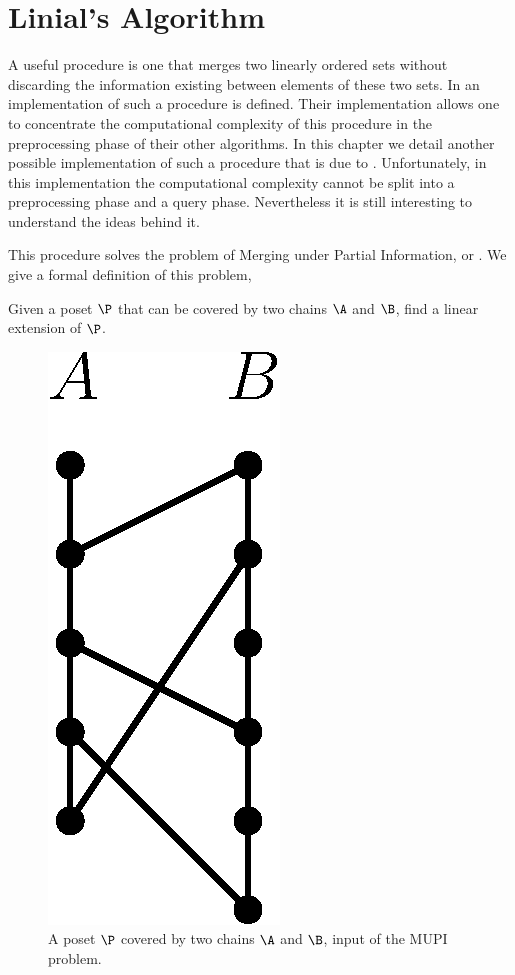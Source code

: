\section{Linial's Algorithm}

A useful procedure is one that merges two linearly ordered sets without
discarding the information existing between elements of these two sets. In
\citet*{cardinal:2013} an implementation of such a procedure is defined. Their
implementation allows one to concentrate the computational complexity of this
procedure in the preprocessing phase of their other algorithms. In this chapter
we detail another possible implementation of such a procedure that is due
to \citet*{linial:1984}. Unfortunately, in this implementation the
computational complexity cannot be split into a preprocessing phase and a query
phase. Nevertheless it is still interesting to understand the ideas behind it.

This procedure solves the problem of Merging under Partial Information, or
. We give a formal definition of this problem,

\begin{problem}
Given a poset \(\P\) that can be covered by two chains \(\A\) and \(\B\), find a
linear extension of \(\P\).
\end{problem}

\begin{figure}
\centering
\includegraphics[height=0.2\textheight]{fig/supi/mupi}
\caption{A poset \(\P\) covered by two chains \(\A\) and \(\B\),
input of the MUPI problem.}
\label{fig:supi:mupi}
\end{figure}

